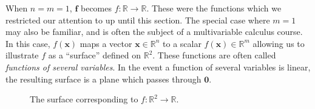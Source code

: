 \documentclass{article}
\newcommand{\R}{\mathbb{R}}
\newcommand{\x}{\mathbf{x}}
\newcommand{\f}{\mathbf{f}}
\newcommand{\ze}{\mathbf{0}}
\theoremstyle{definition}
\begin{document}
	When $ n=m=1 $, $ \f $ becomes $ f:\R\to\R $. These were the functions which we restricted our attention to up until this section. The special case where $ m = 1 $ may also be familiar, and is often the subject of a multivariable calculus course. In this case, $ f(\x) $ maps a vector $ \x\in\R^n $ to a scalar $ f(\x)\in\R^m $ allowing us to illustrate $ f $ as a ``surface'' defined on $ \R^2 $. These functions are often called \textit{\color{red}functions of several variables}. In the event a function of several variables is linear, the resulting surface is a plane which passes through $ \ze $. 
	\begin{figure}[h!]
		\centering
		\caption{The surface corresponding to $ f:\R^2 \to \R $. }
	\end{figure}	
	
\end{document}

